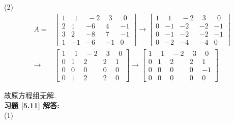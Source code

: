 (2)
\begin{displaymath}
\begin{aligned}
A=&\begin{bmatrix} 1&\ \ 1&\ -2&\ \ 3&\ \ 0\\2&1&-6&4&-1\\3&2&-8&7&-1\\1&-1&-6&-1&0 \end{bmatrix}\rightarrow
\begin{bmatrix}1&\ \ 1&\ -2&\ \ 3&\ \ 0\\0&-1&-2&-2&-1\\0&-1&-2&-2&-1\\0&-2&-4&-4&0  \end{bmatrix}\\ \rightarrow &
\begin{bmatrix}1&\ \ 1&\ -2&\ \ 3&\ \ 0\\0&1&2&2&1\\0&0&0&0&0\\0&1&2&2&0  \end{bmatrix}\rightarrow
\begin{bmatrix} 1&\ \ 1&\ -2&\ \ 3&\ \ 0\\0&1&2&2&1\\0&0&0&0&-1\\0&0&0&0&0 \end{bmatrix}
\end{aligned} \end{displaymath}

故原方程组无解.\\	
\textbf{习题 \ref{5.11} 解答:}\\
(1)

